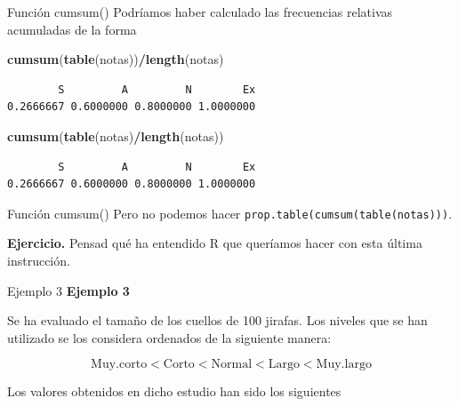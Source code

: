 \documentclass[
  ignorenonframetext,
]{beamer}
\newenvironment{Shaded}{\begin{snugshade}}{\end{snugshade}}
\newcommand{\FunctionTok}[1]{\textcolor[rgb]{0.13,0.29,0.53}{\textbf{#1}}}
\newcommand{\NormalTok}[1]{#1}
\newcommand{\SpecialCharTok}[1]{\textcolor[rgb]{0.81,0.36,0.00}{\textbf{#1}}}
\begin{document}
\begin{frame}[fragile]{Función cumsum()}
\label{funciuxf3n-cumsum-3}
Podríamos haber calculado las frecuencias relativas acumuladas de la
forma

\begin{Shaded}
\begin{Highlighting}[]
\FunctionTok{cumsum}\NormalTok{(}\FunctionTok{table}\NormalTok{(notas))}\SpecialCharTok{/}\FunctionTok{length}\NormalTok{(notas)}
\end{Highlighting}
\end{Shaded}

\begin{verbatim}
        S         A         N        Ex 
0.2666667 0.6000000 0.8000000 1.0000000 
\end{verbatim}

\begin{Shaded}
\begin{Highlighting}[]
\FunctionTok{cumsum}\NormalTok{(}\FunctionTok{table}\NormalTok{(notas)}\SpecialCharTok{/}\FunctionTok{length}\NormalTok{(notas))}
\end{Highlighting}
\end{Shaded}

\begin{verbatim}
        S         A         N        Ex 
0.2666667 0.6000000 0.8000000 1.0000000 
\end{verbatim}
\end{frame}

\begin{frame}[fragile]{Función cumsum()}
\label{funciuxf3n-cumsum-4}
Pero no podemos hacer \texttt{prop.table(cumsum(table(notas)))}.

\textbf{Ejercicio.} Pensad qué ha entendido R que queríamos hacer con
esta última instrucción.
\end{frame}

\begin{frame}{Ejemplo 3}
\label{ejemplo-3}
\textbf{Ejemplo 3}

Se ha evaluado el tamaño de los cuellos de 100 jirafas. Los niveles que
se han utilizado se los considera ordenados de la siguiente manera:

\[\text{Muy.corto}<\text{Corto}<\text{Normal}<\text{Largo}<\text{Muy.largo}\]

Los valores obtenidos en dicho estudio han sido los siguientes
\end{frame}
\end{document}

